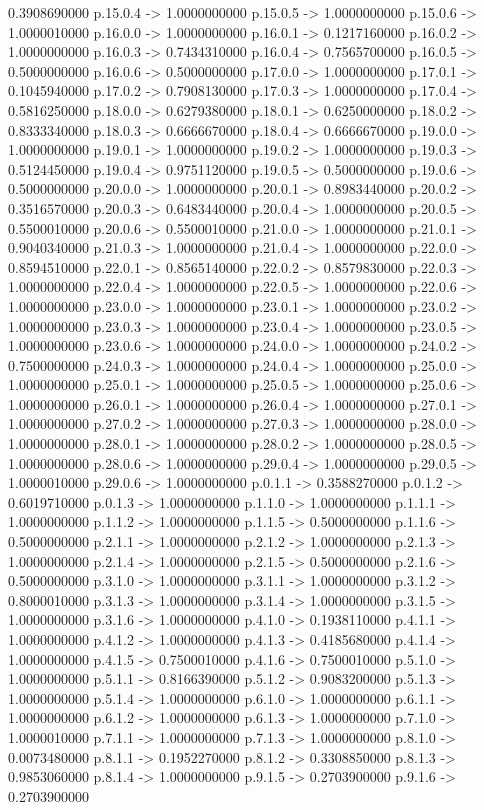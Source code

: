 0.3908690000    p.15.0.4 -> 1.0000000000    p.15.0.5 -> 1.0000000000    p.15.0.6 -> 1.0000010000    p.16.0.0 -> 1.0000000000    p.16.0.1 -> 0.1217160000    p.16.0.2 -> 1.0000000000    p.16.0.3 -> 0.7434310000    p.16.0.4 -> 0.7565700000    p.16.0.5 -> 0.5000000000    p.16.0.6 -> 0.5000000000    p.17.0.0 -> 1.0000000000    p.17.0.1 -> 0.1045940000    p.17.0.2 -> 0.7908130000    p.17.0.3 -> 1.0000000000    p.17.0.4 -> 0.5816250000    p.18.0.0 -> 0.6279380000    p.18.0.1 -> 0.6250000000    p.18.0.2 -> 0.8333340000    p.18.0.3 -> 0.6666670000    p.18.0.4 -> 0.6666670000    p.19.0.0 -> 1.0000000000    p.19.0.1 -> 1.0000000000    p.19.0.2 -> 1.0000000000    p.19.0.3 -> 0.5124450000    p.19.0.4 -> 0.9751120000    p.19.0.5 -> 0.5000000000    p.19.0.6 -> 0.5000000000    p.20.0.0 -> 1.0000000000    p.20.0.1 -> 0.8983440000    p.20.0.2 -> 0.3516570000    p.20.0.3 -> 0.6483440000    p.20.0.4 -> 1.0000000000    p.20.0.5 -> 0.5500010000    p.20.0.6 -> 0.5500010000    p.21.0.0 -> 1.0000000000    p.21.0.1 -> 0.9040340000    p.21.0.3 -> 1.0000000000    p.21.0.4 -> 1.0000000000    p.22.0.0 -> 0.8594510000    p.22.0.1 -> 0.8565140000    p.22.0.2 -> 0.8579830000    p.22.0.3 -> 1.0000000000    p.22.0.4 -> 1.0000000000    p.22.0.5 -> 1.0000000000    p.22.0.6 -> 1.0000000000    p.23.0.0 -> 1.0000000000    p.23.0.1 -> 1.0000000000    p.23.0.2 -> 1.0000000000    p.23.0.3 -> 1.0000000000    p.23.0.4 -> 1.0000000000    p.23.0.5 -> 1.0000000000    p.23.0.6 -> 1.0000000000    p.24.0.0 -> 1.0000000000    p.24.0.2 -> 0.7500000000    p.24.0.3 -> 1.0000000000    p.24.0.4 -> 1.0000000000    p.25.0.0 -> 1.0000000000    p.25.0.1 -> 1.0000000000    p.25.0.5 -> 1.0000000000    p.25.0.6 -> 1.0000000000    p.26.0.1 -> 1.0000000000    p.26.0.4 -> 1.0000000000    p.27.0.1 -> 1.0000000000    p.27.0.2 -> 1.0000000000    p.27.0.3 -> 1.0000000000    p.28.0.0 -> 1.0000000000    p.28.0.1 -> 1.0000000000    p.28.0.2 -> 1.0000000000    p.28.0.5 -> 1.0000000000    p.28.0.6 -> 1.0000000000    p.29.0.4 -> 1.0000000000    p.29.0.5 -> 1.0000010000    p.29.0.6 -> 1.0000000000    p.0.1.1 -> 0.3588270000    p.0.1.2 -> 0.6019710000    p.0.1.3 -> 1.0000000000    p.1.1.0 -> 1.0000000000    p.1.1.1 -> 1.0000000000    p.1.1.2 -> 1.0000000000    p.1.1.5 -> 0.5000000000    p.1.1.6 -> 0.5000000000    p.2.1.1 -> 1.0000000000    p.2.1.2 -> 1.0000000000    p.2.1.3 -> 1.0000000000    p.2.1.4 -> 1.0000000000    p.2.1.5 -> 0.5000000000    p.2.1.6 -> 0.5000000000    p.3.1.0 -> 1.0000000000    p.3.1.1 -> 1.0000000000    p.3.1.2 -> 0.8000010000    p.3.1.3 -> 1.0000000000    p.3.1.4 -> 1.0000000000    p.3.1.5 -> 1.0000000000    p.3.1.6 -> 1.0000000000    p.4.1.0 -> 0.1938110000    p.4.1.1 -> 1.0000000000    p.4.1.2 -> 1.0000000000    p.4.1.3 -> 0.4185680000    p.4.1.4 -> 1.0000000000    p.4.1.5 -> 0.7500010000    p.4.1.6 -> 0.7500010000    p.5.1.0 -> 1.0000000000    p.5.1.1 -> 0.8166390000    p.5.1.2 -> 0.9083200000    p.5.1.3 -> 1.0000000000    p.5.1.4 -> 1.0000000000    p.6.1.0 -> 1.0000000000    p.6.1.1 -> 1.0000000000    p.6.1.2 -> 1.0000000000    p.6.1.3 -> 1.0000000000    p.7.1.0 -> 1.0000010000    p.7.1.1 -> 1.0000000000    p.7.1.3 -> 1.0000000000    p.8.1.0 -> 0.0073480000    p.8.1.1 -> 0.1952270000    p.8.1.2 -> 0.3308850000    p.8.1.3 -> 0.9853060000    p.8.1.4 -> 1.0000000000    p.9.1.5 -> 0.2703900000    p.9.1.6 -> 0.2703900000    
